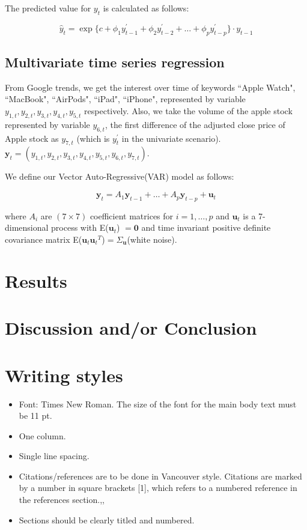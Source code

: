 \documentclass[conference,onecolumn,11pt]{IEEEtran}
\begin{document}
The predicted value for $y_t$ is calculated as follows:

\[
\hat{y}_t = \exp\{c + \phi_{1}y^{'}_{t-1} + \phi_{2}y^{'}_{t-2} + \dots + \phi_{p}y^{'}_{t-p}\}\cdot y_{t-1}
\]

\subsection*{Multivariate time series regression}



From Google trends, we get the interest over time of keywords ``Apple Watch", ``MacBook", ``AirPods", ``iPad", ``iPhone", represented by variable $y_{1,t},y_{2,t},y_{3,t},y_{4,t},y_{5,t}$ respectively. Also, we take the volume of the apple stock represented by variable $y_{6,t}$, the first difference of the adjusted close price of Apple stock as $y_{7,t}$ (which is $y^{'}_t$ in the univariate scenario). $\mathbf{y}_t = (y_{1,t},y_{2,t},y_{3,t},y_{4,t},y_{5,t},y_{6,t},y_{7,t})$.

We define our Vector Auto-Regressive(VAR) model as follows:

\[
\mathbf{y}_t = A_1\mathbf{y}_{t-1}+\ldots+A_p\mathbf{y}_{t-p}+\mathbf{u}_t
\]

where $A_i$ are $(7\times7)$ coefficient matrices for $i=1,\ldots,p$ and $\mathbf{u}_t$ is a 7-dimensional process with E($\mathbf{u}_t$) $= \mathbf{0}$ and time invariant positive definite covariance matrix E(${\mathbf{u}_t}{\mathbf{u}_t}^T$)$=\Sigma_\mathbf{u}$(white noise).



\section{Results}
\section{Discussion and/or Conclusion}

\section{Writing styles}

\begin{itemize}
\item Font: Times New Roman. The size of the font for the main body text must be 11 pt. 
\item One column. 
\item Single line spacing. 
\item Citations/references are to be done in Vancouver style. Citations are marked by a number in square brackets [1], which refers to a numbered reference in the references section.\cite{Xu2018},\cite{Khanderwal2021},\cite{Vijh2020}
\item Sections should be clearly titled and numbered. 
\end{itemize}
\end{document}
